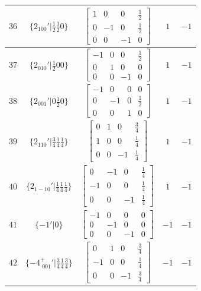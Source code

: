 \documentclass[fleqn,8pt]{jsarticle}
\begin{document}
\begin{longtable}{ccccc}
$ 36 $ & $ \{2{}_{100}{}'|\frac{1}{2} \frac{1}{2} 0\} $ & $ \begin{bmatrix} 1 & 0 & 0 & \frac{1}{2} \\ 0 & -1 & 0 & \frac{1}{2} \\ 0 & 0 & -1 & 0 \end{bmatrix} $ & $ 1 $ & $ -1 $ \\ \hline
$ 37 $ & $ \{2{}_{010}{}'|\frac{1}{2} 0 0\} $ & $ \begin{bmatrix} -1 & 0 & 0 & \frac{1}{2} \\ 0 & 1 & 0 & 0 \\ 0 & 0 & -1 & 0 \end{bmatrix} $ & $ 1 $ & $ -1 $ \\ \hline
$ 38 $ & $ \{2{}_{001}{}'|0 \frac{1}{2} 0\} $ & $ \begin{bmatrix} -1 & 0 & 0 & 0 \\ 0 & -1 & 0 & \frac{1}{2} \\ 0 & 0 & 1 & 0 \end{bmatrix} $ & $ 1 $ & $ -1 $ \\ \hline
$ 39 $ & $ \{2{}_{110}{}'|\frac{3}{4} \frac{1}{4} \frac{1}{4}\} $ & $ \begin{bmatrix} 0 & 1 & 0 & \frac{3}{4} \\ 1 & 0 & 0 & \frac{1}{4} \\ 0 & 0 & -1 & \frac{1}{4} \end{bmatrix} $ & $ 1 $ & $ -1 $ \\ \hline
$ 40 $ & $ \{2{}_{1-10}{}'|\frac{1}{4} \frac{1}{4} \frac{1}{4}\} $ & $ \begin{bmatrix} 0 & -1 & 0 & \frac{1}{4} \\ -1 & 0 & 0 & \frac{1}{4} \\ 0 & 0 & -1 & \frac{1}{4} \end{bmatrix} $ & $ 1 $ & $ -1 $ \\ \hline
$ 41 $ & $ \{-1{}'|0\} $ & $ \begin{bmatrix} -1 & 0 & 0 & 0 \\ 0 & -1 & 0 & 0 \\ 0 & 0 & -1 & 0 \end{bmatrix} $ & $ -1 $ & $ -1 $ \\ \hline
$ 42 $ & $ \{-4^{+}_{\,\,001}{}'|\frac{3}{4} \frac{1}{4} \frac{3}{4}\} $ & $ \begin{bmatrix} 0 & 1 & 0 & \frac{3}{4} \\ -1 & 0 & 0 & \frac{1}{4} \\ 0 & 0 & -1 & \frac{3}{4} \end{bmatrix} $ & $ -1 $ & $ -1 $ \\ \hline

\end{longtable}
\end{document}
